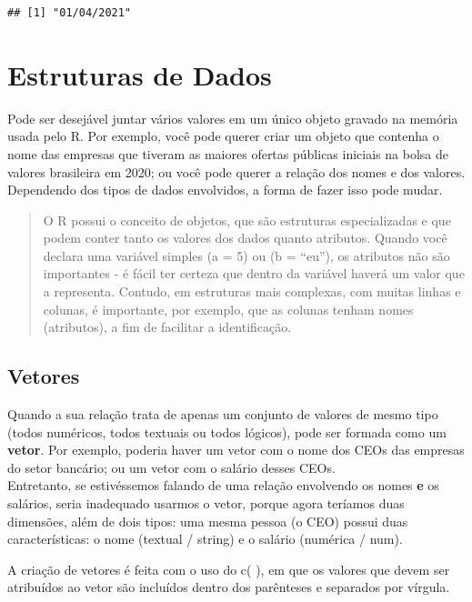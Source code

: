 \documentclass[
]{book}
\begin{document}
\begin{verbatim}
## [1] "01/04/2021"
\end{verbatim}

\hypertarget{estruturas-de-dados}{%
\chapter{Estruturas de Dados}\label{estruturas-de-dados}}

Pode ser desejável juntar vários valores em um único objeto gravado na memória usada pelo R. Por exemplo, você pode querer criar um objeto que contenha o nome das empresas que tiveram as maiores ofertas públicas iniciais na bolsa de valores brasileira em 2020; ou você pode querer a relação dos nomes e dos valores. Dependendo dos tipos de dados envolvidos, a forma de fazer isso pode mudar.

\begin{quote}
O R possui o conceito de objetos, que são estruturas especializadas e que podem conter tanto os valores dos dados quanto atributos. Quando você declara uma variável simples (a = 5) ou (b = ``eu''), os atributos não são importantes - é fácil ter certeza que dentro da variável haverá um valor que a representa. Contudo, em estruturas mais complexas, com muitas linhas e colunas, é importante, por exemplo, que as colunas tenham nomes (atributos), a fim de facilitar a identificação.
\end{quote}

\hypertarget{vetores}{%
\section{Vetores}\label{vetores}}

Quando a sua relação trata de apenas um conjunto de valores de mesmo tipo (todos numéricos, todos textuais ou todos lógicos), pode ser formada como um \textbf{vetor}. Por exemplo, poderia haver um vetor com o nome dos CEOs das empresas do setor bancário; ou um vetor com o salário desses CEOs.\\
Entretanto, se estivéssemos falando de uma relação envolvendo os nomes \textbf{e} os salários, seria inadequado usarmos o vetor, porque agora teríamos duas dimensões, além de dois tipos: uma mesma pessoa (o CEO) possui duas características: o nome (textual / string) e o salário (numérica / num).

A criação de vetores é feita com o uso do c( ), em que os valores que devem ser atribuídos ao vetor são incluídos dentro dos parênteses e separados por vírgula.
\end{document}
